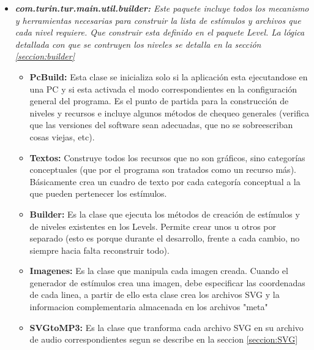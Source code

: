 \documentclass{article}
\begin{document}
\begin{itemize}
        \item \textit{\textbf{com.turin.tur.main.util.builder:} Este paquete incluye todos los mecanismo y herramientas necesarias para construir la lista de estímulos y archivos que cada nivel requiere. Que construir esta definido en el paquete Level. La lógica detallada con que se contruyen los niveles se detalla en la sección \ref{seccion:builder}}
        \begin{itemize}
            \item \textbf{PcBuild:} Esta clase se inicializa solo si la aplicación esta ejecutandose en una PC y si esta activada el modo correspondientes en la configuración general del programa. Es el punto de partida para la construcción de niveles y recursos e incluye algunos métodos de chequeo generales (verifica que las versiones del software sean adecuadas, que no se sobreescriban cosas viejas, etc). 
            \item \textbf{Textos:} Construye todos los recursos que no son gráficos, sino categorías conceptuales (que por el programa son tratados como un recurso más). Básicamente crea un cuadro de texto por cada categoría conceptual a la que pueden pertenecer los estímulos. 
            \item \textbf{Builder:} Es la clase que ejecuta los métodos de creación de estímulos y de niveles existentes en los Levels. Permite crear unos u otros por separado (esto es porque durante el desarrollo, frente a cada cambio, no siempre hacia falta reconstruir todo).
            \item \textbf{Imagenes:} Es la clase que manipula cada imagen creada. Cuando el generador de estímulos crea una imagen, debe especificar las coordenadas de cada linea, a partir de ello esta clase crea los archivos SVG y la informacion complementaria almacenada en los archivos "meta"
            \item \textbf{SVGtoMP3:} Es la clase que tranforma cada archivo SVG en su archivo de audio correspondientes segun se describe en la seccion \ref{seccion:SVG}
        \end{itemize}
        

\end{itemize}
\end{document}
